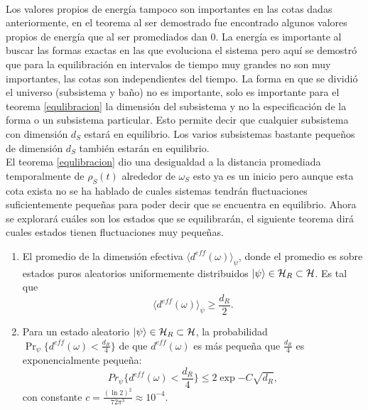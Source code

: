 \\
Los valores propios de energía tampoco son importantes en las cotas dadas anteriormente, en el teorema al ser demostrado fue encontrado algunos valores propios de energía que al ser promediados dan 0. La energía es importante al buscar las formas exactas en las que evoluciona el sistema pero aquí se demostró que para la equilibración en intervalos de tiempo muy grandes no son muy importantes, las cotas son independientes del tiempo. La forma en que se dividió el universo (subsistema y baño) no es importante, solo es importante para el teorema \ref{equlibracion} la dimensión del subsistema y no la especificación de la forma o un subsistema particular. Esto permite decir que cualquier subsistema con dimensión $d_{S}$ estará en equilibrio. Los varios subsistemas bastante pequeños de dimensión $d_{S}$ también estarán en equilibrio.
\\
El teorema \ref{equlibracion} dio una desigualdad a la distancia promediada temporalmente de $\rho_{S}(t)$ alrededor de $\omega_{S}$ esto ya es un inicio pero aunque esta cota exista no se ha hablado de cuales sistemas tendrán fluctuaciones suficientemente pequeñas para poder decir que se encuentra en equilibrio. Ahora se explorará cuáles son los estados que se equilibrarán, el siguiente teorema dirá cuales estados tienen fluctuaciones muy pequeñas.

\begin{theorem}\label{teorema2}

\begin{enumerate}

\item El promedio de la dimensión efectiva $\langle d^{eff}(\omega) \rangle_{\psi}$, donde el promedio es sobre estados puros aleatorios uniformemente distribuidos $\ket{\psi} \in \mathcal{H}_{R} \subset \mathcal{H}$. Es tal que
\begin{equation}
\langle d^{eff}(\omega) \rangle_{\psi} \ge \frac{d_{R}}{2}.
\end{equation}
\item Para un estado aleatorio $\ket{\psi} \in \mathcal{H}_{R} \subset \mathcal{H}$, la probabilidad $\Pr_{\psi} \{ d^{eff}(\omega) < \frac{d_{R}}{4}  \}$ de que $d^{eff}(\omega)$ es más pequeña que $\frac{d_{R}}{4}$ es exponencialmente pequeña:
\begin{equation}
Pr_{\psi} \{ d^{eff}(\omega) < \frac{d_{R}}{4}  \} \leq 2 \exp{-C \sqrt{d_{R}}},
\end{equation}
con constante $c= \frac{(\ln 2)^{2}}{72 \pi^{3}} \approx 10^{-4}$.
\end{enumerate}
\end{theorem}


